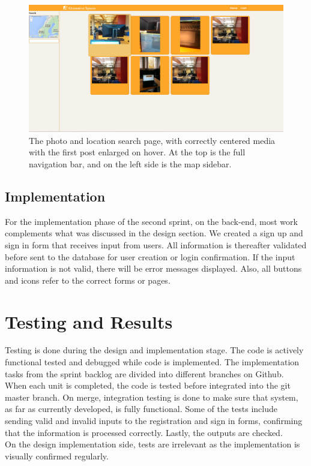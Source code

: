 \begin{figure}[ht!]
\centering
\includegraphics[width={\linewidth}]{Sprint2/img/Sprint2-PhotoPage.png}
\caption{The photo and location search page, with correctly centered media with the first post enlarged on hover. At the top is the full navigation bar, and on the left side is the map sidebar. \label{overflow}}
\end{figure}


\subsection{Implementation}
\label{subsec:S2DesignImplImpl}
For the implementation phase of the second sprint, on the back-end, most work complements what was discussed in the design section. We created a sign up and sign in form that receives input from users. All information is thereafter validated before sent to the database for user creation or login confirmation. If the input information is not valid, there will be error messages displayed. Also, all buttons and icons refer to the correct forms or pages. 

\section{Testing and Results}
\label{sec:S2Testing}
Testing is done during the design and implementation stage. The code is actively functional tested and debugged while code is implemented. The implementation tasks from the sprint backlog are divided into different branches on Github. When each unit is completed, the code is tested before integrated into the git master branch. On merge, integration testing is done to make sure that system, as far as currently developed, is fully functional. Some of the tests include sending valid and invalid inputs to the registration and sign in forms, confirming that the information is processed correctly. Lastly, the outputs are checked. \\
On the design implementation side, tests are irrelevant as the implementation is visually confirmed regularly. 


